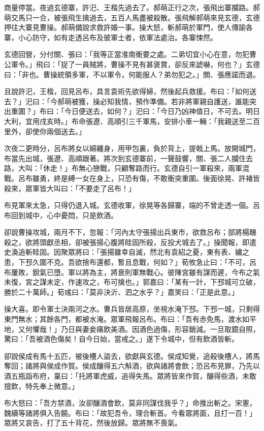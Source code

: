 商量停當。夜過玄德寨，許汜、王楷先過去了。郝萌正行之次，張飛出寨攔路。郝萌交馬只一合，被張飛生擒過去，五百人馬盡被殺散。張飛解郝萌來見玄德，玄德押往大寨見曹操。郝萌備說求救許婚一事。操大怒，斬郝萌於軍門，使人傳諭各寨，小心防守，如有走透呂布及彼軍士者，依軍法處治。各寨悚然。

玄德回營，分付關、張曰：「我等正當淮南衝要之處。二弟切宜小心在意，勿犯曹公軍令。」飛曰：「捉了一員賊將，曹操不見有甚褒賞，卻反來諕嚇，何也？」玄德曰：「非也。曹操統領多軍，不以軍令，何能服人？弟勿犯之。」關、張應諾而退。

且說許汜，王楷，回見呂布，具言袁術先欲得婦，然後起兵救援。布曰：「如何送去？」汜曰：「今郝萌被獲，操必知我情，預作準備。若非將軍親自護送，誰能突出重圍？」布曰：「今日便送去，如何？」汜曰：「今日乃凶神值日，不可去。明日大利，宜用戌亥時。」布命張遼、高順引三千軍馬，安排小車一輛：「我親送至二百里外，卻使你兩個送去。」

次夜二更時分，呂布將女以綿纏身，用甲包裏，負於背上，提戟上馬。放開城門，布當先出城，張遼、高順跟著。將次到玄德寨前，一聲鼓響，關、張二人攔住去路，大叫：「休走！」布無心戀戰，只顧奪路而行。玄德自引一軍殺來，兩軍混戰。呂布雖勇，終是縛一女在身上，只恐有傷，不敢衝突重圍。後面徐晃、許褚皆殺來，眾軍皆大叫曰：「不要走了呂布！」

布見軍來太急，只得仍退入城。玄德收軍，徐晃等各歸寨，端的不曾走透一個。呂布回到城中，心中憂悶，只是飲酒。

卻說曹操攻城，兩月不下，忽報：「河內太守張揚出兵東市，欲救呂布；部將楊醜殺之，欲將頭獻丞相，卻被張揚心腹將眭固所殺，反投犬城去了。」操聞報，即遣史渙追斬眭固。因聚眾將曰：「張揚雖幸自滅，然北有袁紹之憂，東有表、繡之患，下邳久圍不克。吾欲捨布還都，暫且息戰，何如？」荀攸急止曰：「不可，呂布屢敗，銳氣已墮。軍以將為主，將衰則軍無戰心。彼陳宮雖有謀而遲，今布之氣未復，宮之謀未定，作速攻之，布可擒也。」郭嘉曰：「某有一計，下邳城可立破，勝於二十萬師。」荀彧曰：「莫非決沂、泗之水乎？」嘉笑曰：「正是此意。」

操大喜。即令軍士決兩河之水。曹兵皆居高原，坐視水淹下邳。下邳一城，只剩得東門無水；其餘各門，都被水淹。眾軍飛報呂布。布曰：「吾有赤免馬，渡水如平地，又何懼哉！」乃日與妻妾痛飲美酒。因酒色過傷，形容銷減。一旦取鏡自照，驚曰：「吾被酒色傷矣！自今日始，當戒之。」遂下令城中，但有飲酒皆斬。

卻說侯成有馬十五匹，被後槽人盜去，欲獻與玄德。侯成知覺，追殺後槽人，將馬奪回；諸將與侯成作賀。侯成釀得五六斛酒，欲與諸將會飲；恐呂布見罪，乃先以酒五瓶詣布府，稟曰：「托將軍虎威，追得失馬。眾將皆來作賀，釀得些酒，未敢擅飲，特先奉上微意。」

布大怒曰：「吾方禁酒，汝卻釀酒會飲，莫非同謀伐我乎？」命推出斬之。宋憲，魏續等諸將俱入告饒。布曰：「故犯吾令，理合斬首。今看眾將面，且打一百！」眾將又哀告，打了五十背花，然後放歸。眾將無不喪氣。

